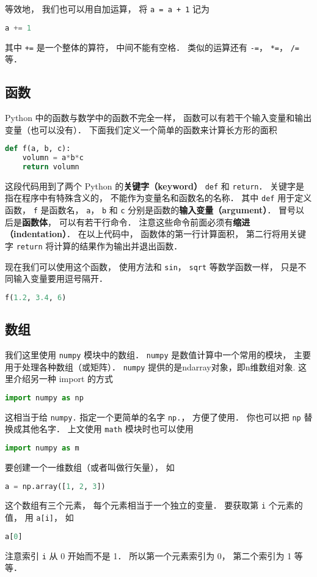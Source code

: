 等效地， 我们也可以用自加运算， 将 \verb|a = a + 1| 记为
\begin{lstlisting}[language=python]
a += 1
\end{lstlisting}
其中 \verb|+=| 是一个整体的算符， 中间不能有空格． 类似的运算还有 \verb|-=|， \verb|*=|， \verb|/=| 等．

\subsection{函数}
Python 中的函数与数学中的函数不完全一样， 函数可以有若干个输入变量和输出变量（也可以没有）． 下面我们定义一个简单的函数来计算长方形的面积
\begin{lstlisting}[language=python]
def f(a, b, c):
    volumn = a*b*c
    return volumn
\end{lstlisting}
这段代码用到了两个 Python 的\textbf{关键字（keyword）} \verb|def| 和 \verb|return|． 关键字是指在程序中有特殊含义的， 不能作为变量名和函数名的名称． 其中 \verb|def| 用于定义函数， \verb|f| 是函数名， \verb|a|， \verb|b| 和 \verb|c| 分别是函数的\textbf{输入变量（argument）}． 冒号以后是\textbf{函数体}， 可以有若干行命令． 注意这些命令前面必须有\textbf{缩进（indentation）}．  在以上代码中， 函数体的第一行计算面积， 第二行将用关键字 \verb|return| 将计算的结果作为输出并退出函数．

现在我们可以使用这个函数， 使用方法和 \verb|sin|， \verb|sqrt| 等数学函数一样， 只是不同输入变量要用逗号隔开．
\begin{lstlisting}[language=python]
f(1.2, 3.4, 6)
\end{lstlisting}

\subsection{数组}
我们这里使用 \verb|numpy| 模块中的数组． \verb|numpy| 是数值计算中一个常用的模块， 主要用于处理各种数组（或矩阵）． \verb|numpy| 提供的是ndarray对象，即n维数组对象. 这里介绍另一种 import 的方式
\begin{lstlisting}[language=python]
import numpy as np
\end{lstlisting}
这相当于给 \verb|numpy.| 指定一个更简单的名字 \verb|np.|， 方便了使用． 你也可以把 \verb|np| 替换成其他名字． 上文使用 \verb|math| 模块时也可以使用
\begin{lstlisting}[language=python]
import numpy as m
\end{lstlisting}

要创建一个一维数组（或者叫做行矢量）， 如
\begin{lstlisting}[language=python]
a = np.array([1, 2, 3])
\end{lstlisting}
这个数组有三个元素， 每个元素相当于一个独立的变量． 要获取第 \verb|i| 个元素的值， 用 \verb|a[i]|， 如
\begin{lstlisting}[language=python]
a[0]
\end{lstlisting}
注意索引 \verb|i| 从 0 开始而不是 1． 所以第一个元素索引为 0， 第二个索引为 1 等等．

